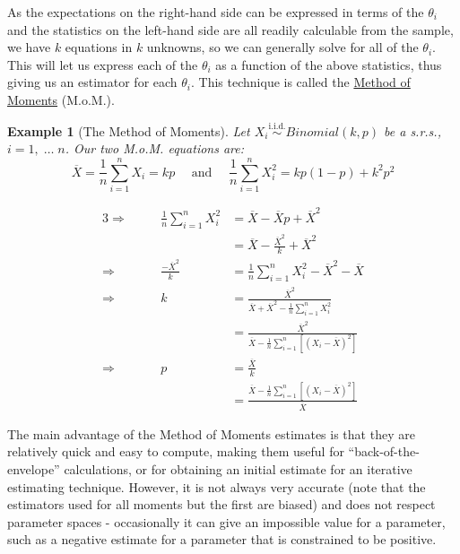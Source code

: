 \documentclass[12pt,a4paper]{article}
\newtheorem{ex}[thm]{Example}
\begin{document}
As the expectations on the right-hand side can be expressed in terms of the $\theta_i$ and the statistics on the left-hand side are all readily calculable from the sample, we have $k$ equations in $k$ unknowns, so we can generally solve for all of the $\theta_i$. This will let us express each of the $\theta_i$ as a function of the above statistics, thus giving us an estimator for each $\theta_i$. This technique is called the \underline{Method of Moments} (M.o.M.).

\begin{ex}[The Method of Moments]\vspace{1cm}

Let $X_i \overset{\text{i.i.d.}}{\sim} Binomial(k,p)$ be a s.r.s., $i = 1,\;\hdots\;n$. Our two M.o.M. equations are:
$$\overline{X}=\frac{1}{n}\sum_{i=1}^n X_i = kp \quad\mbox{ and }\quad \frac{1}{n}\sum_{i=1}^n X_i^2 = kp(1-p) + k^2p^2$$

\begin{alignat*}{3}
\Rightarrow\quad & & \frac{1}{n} \sum_{i=1}^n X_i^2 &= \overline{X} - \overline{X}p + \overline{X}^2\\
& & &= \overline{X} - \frac{\overline{X}^2}{k} + \overline{X}^2\\
\Rightarrow \quad & & \frac{-\overline{X}^2}{k} &= \frac{1}{n}\sum_{i=1}^n X_i^2 - \overline{X}^2 - \overline{X}\\
\Rightarrow\quad & & k &= \frac{\overline{X}^2}{\overline{X}+\overline{X}^2 - \frac{1}{n}\sum\limits_{i=1}^n X_i^2}\\
& & &= \frac{\overline{X}^2}{\overline{X} - \frac{1}{n}\sum\limits_{i=1}^n \left[(X_i - \overline{X})^2\right]}\\
\Rightarrow\quad &  & p &= \frac{\overline{X}}{k}\\
& & &= \frac{\overline{X} - \frac{1}{n}\sum\limits_{i=1}^n \left[(X_i - \overline{X})^2\right]}{\overline{X}}
\end{alignat*}

\end{ex}

The main advantage of the Method of Moments estimates is that they are relatively quick and easy to compute, making them useful for ``back-of-the-envelope'' calculations, or for obtaining an initial estimate for an iterative estimating technique. However, it is not always very accurate (note that the estimators used for all moments but the first are biased) and does not respect parameter spaces - occasionally it can give an impossible value for a parameter, such as a negative estimate for a parameter that is constrained to be positive.
\end{document}
